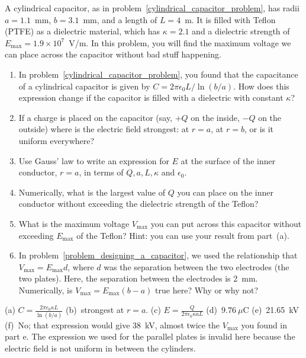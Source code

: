 \begin{Exercise}
A cylindrical capacitor, as in problem~\ref{cylindrical_capacitor_problem}, has radii $a=1.1$~mm, $b=3.1$~mm, and a length of $L=4$~m.  
It is filled with Teflon (PTFE) as a dielectric material, which has $\kappa=2.1$ and a dielectric strength of $E_\text{max}=1.9\times 10^7$~V/m.  
In this problem, you will find the maximum voltage we can place across the capacitor without bad stuff happening.  
\begin{enumerate}[label=(\alph*), nosep, topsep=-2ex, after={\vspace{2ex}}]
\item In problem~\ref{cylindrical_capacitor_problem}, you found that the capacitance of a cylindrical capacitor is given by $C=2\pi\epsilon_0 L/\ln(b/a)$.   How does this expression change if the capacitor is filled with a dielectric with constant $\kappa$?
\item If a charge is placed on the capacitor (say, $+Q$ on the inside, $-Q$ on the outside) where is the electric field strongest: at $r=a$, at $r=b$, or is it uniform everywhere?  
\item Use Gauss' law to write an expression for $E$ at the surface of the inner conductor, $r=a$, in terms of $Q, a, L, \kappa$ and $\epsilon_0$.  
\item Numerically, what is the largest value of $Q$ you can place on the inner conductor without exceeding the dielectric strength of the Teflon?  
\item What is the maximum voltage $V_\text{max}$ you can put across this capacitor without exceeding $E_\text{max}$ of the Teflon?  Hint: you can use your result from part~(a).  
\item In problem~\ref{problem_designing_a_capacitor}, we used the relationship that $V_\text{max}=E_\text{max} d$, where $d$ was the separation between the two electrodes (the two plates).  Here, the separation between the electrodes is 2~mm.  Numerically, is $V_\text{max}=E_\text{max} (b-a)$ true here?  Why or why not?
\end{enumerate}
\end{Exercise}
\begin{Answer}
(a) $\displaystyle C=\frac{2\pi\epsilon_0 \kappa L}{\ln(b/a)}$
(b)~strongest at $r=a$.  
(c) $\displaystyle E=\frac{Q}{2\pi\epsilon_0 \kappa aL}  $
(d)~$9.76~\mu$C  
(e)~21.65~kV 
(f)~No; that expression would give 38~kV, almost twice the $V_\text{max}$ you found in part e.  The expression we used for the parallel plates is invalid here because the electric field is not uniform in between the cylinders.
\end{Answer}


